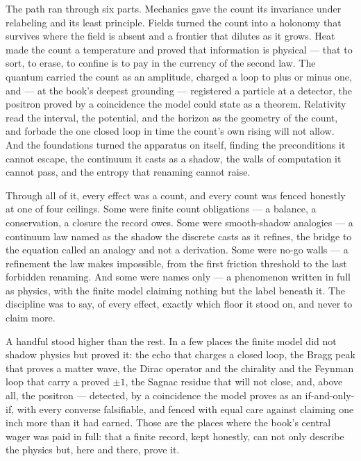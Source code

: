 The path ran through six parts. Mechanics gave the count its invariance under relabeling and its least
principle. Fields turned the count into a holonomy that survives where the field is absent and a frontier that
dilutes as it grows. Heat made the count a temperature and proved that information is physical --- that to
sort, to erase, to confine is to pay in the currency of the second law. The quantum carried the count as an
amplitude, charged a loop to plus or minus one, and --- at the book's deepest grounding --- registered a
particle at a detector, the positron proved by a coincidence the model could state as a theorem. Relativity
read the interval, the potential, and the horizon as the geometry of the count, and forbade the one closed
loop in time the count's own rising will not allow. And the foundations turned the apparatus on itself, finding
the preconditions it cannot escape, the continuum it casts as a shadow, the walls of computation it cannot
pass, and the entropy that renaming cannot raise.

Through all of it, every effect was a count, and every count was fenced honestly at one of four ceilings. Some
were finite count obligations --- a balance, a conservation, a closure the record owes. Some were smooth-shadow
analogies --- a continuum law named as the shadow the discrete casts as it refines, the bridge to the equation
called an analogy and not a derivation. Some were no-go walls --- a refinement the law makes impossible, from
the first friction threshold to the last forbidden renaming. And some were names only --- a phenomenon written
in full as physics, with the finite model claiming nothing but the label beneath it. The discipline was to say,
of every effect, exactly which floor it stood on, and never to claim more.

A handful stood higher than the rest. In a few places the finite model did not shadow physics but proved it:
the echo that charges a closed loop, the Bragg peak that proves a matter wave, the Dirac operator and the
chirality and the Feynman loop that carry a proved $\pm 1$, the Sagnac residue that will not close, and, above
all, the positron --- detected, by a coincidence the model proves as an if-and-only-if, with every converse
falsifiable, and fenced with equal care against claiming one inch more than it had earned. Those are the places
where the book's central wager was paid in full: that a finite record, kept honestly, can not only describe the
physics but, here and there, prove it.

